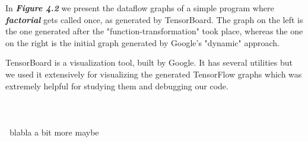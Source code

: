 \documentclass[ack,preface]{dithesis}
\begin{document}
In  \textit{\textbf{Figure 4.2}} we present the dataflow graphs of a simple program where \textit{\textbf{factorial}} gets called once, as generated by TensorBoard. 
The graph on the left is the one generated after the "function-transformation" took place, whereas the one on the right is the initial graph generated by Google's "dynamic" approach.

TensorBoard is a visualization tool, built by Google. It has several utilities but we used it extensively for visualizing the generated TensorFlow graphs which was extremely helpful for studying them and debugging our code.\\\\\\\\\ blabla a bit more maybe \\\\\\\\\\\\\
\end{document}
